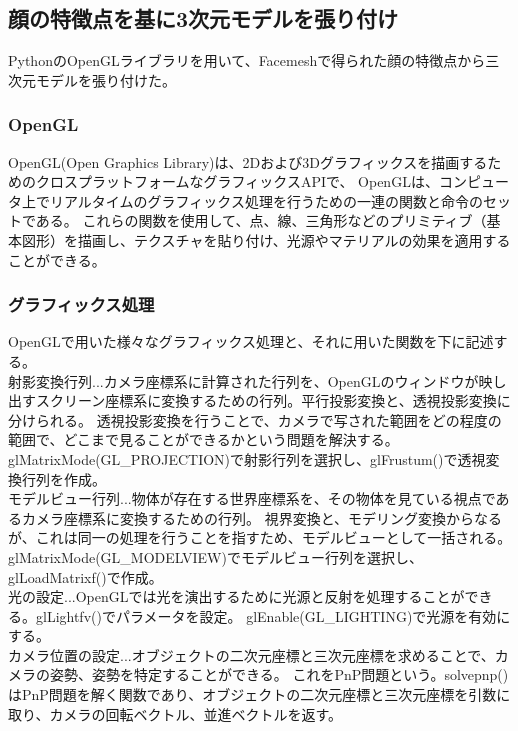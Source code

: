 \documentclass[]{jarticle}          %
\begin{document}
\subsection{顔の特徴点を基に3次元モデルを張り付け}
PythonのOpenGLライブラリを用いて、Facemeshで得られた顔の特徴点から三次元モデルを張り付けた。
\subsubsection{OpenGL}
OpenGL(Open Graphics Library)は、2Dおよび3Dグラフィックスを描画するためのクロスプラットフォームなグラフィックスAPIで、
OpenGLは、コンピュータ上でリアルタイムのグラフィックス処理を行うための一連の関数と命令のセットである。
これらの関数を使用して、点、線、三角形などのプリミティブ（基本図形）を描画し、テクスチャを貼り付け、光源やマテリアルの効果を適用することができる。

\subsubsection{グラフィックス処理}
OpenGLで用いた様々なグラフィックス処理と、それに用いた関数を下に記述する。\\
\indent 射影変換行列...カメラ座標系に計算された行列を、OpenGLのウィンドウが映し出すスクリーン座標系に変換するための行列。平行投影変換と、透視投影変換に分けられる。
透視投影変換を行うことで、カメラで写された範囲をどの程度の範囲で、どこまで見ることができるかという問題を解決する。
glMatrixMode(GL\_PROJECTION)で射影行列を選択し、glFrustum()で透視変換行列を作成。\\
\indent モデルビュー行列...物体が存在する世界座標系を、その物体を見ている視点であるカメラ座標系に変換するための行列。
視界変換と、モデリング変換からなるが、これは同一の処理を行うことを指すため、モデルビューとして一括される。
glMatrixMode(GL\_MODELVIEW)でモデルビュー行列を選択し、glLoadMatrixf()で作成。\\
\indent 光の設定...OpenGLでは光を演出するために光源と反射を処理することができる。glLightfv()でパラメータを設定。
glEnable(GL\_LIGHTING)で光源を有効にする。\\
\indent カメラ位置の設定...オブジェクトの二次元座標と三次元座標を求めることで、カメラの姿勢、姿勢を特定することができる。
これをPnP問題という。solvepnp()はPnP問題を解く関数であり、オブジェクトの二次元座標と三次元座標を引数に取り、カメラの回転ベクトル、並進ベクトルを返す。\\
\end{document}
